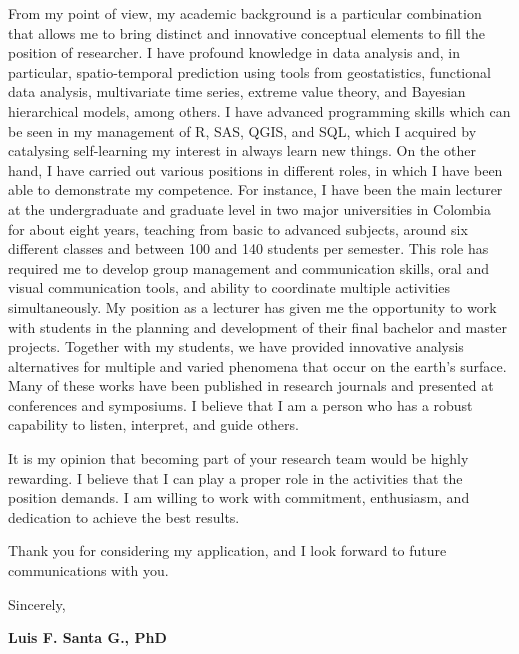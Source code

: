 \documentclass[11pt, a4paper]{awesome-cv}
\begin{document}
\begin{cvletter}
From my point of view, my academic background is a particular combination that allows me to bring distinct and innovative conceptual elements to fill the position of researcher. I have profound knowledge in data analysis and, in particular, spatio-temporal prediction using tools from geostatistics, functional data analysis, multivariate time series, extreme value theory, and  Bayesian hierarchical models, among others. I have advanced programming skills which can be seen in my management of R, SAS, QGIS, and SQL, which I acquired by catalysing self-learning my interest in always learn new things. On the other hand, I have carried out various positions in different roles, in which I have been able to demonstrate my competence. For instance, I have been the main lecturer at the undergraduate and graduate level in two major universities in Colombia for about eight years, teaching from basic to advanced subjects, around six different classes and between 100 and 140 students per semester. This role has required me to develop group management and communication skills, oral and visual communication tools, and ability to coordinate multiple activities simultaneously. My position as a lecturer has given me the opportunity to work with students in the planning and development of their final bachelor and master projects. Together with my students, we have provided innovative analysis alternatives for multiple and varied phenomena that occur on the earth's surface. Many of these works have been published in research journals and presented at conferences and symposiums. I believe that I am a person who has a robust capability to listen, interpret, and guide others. \par
It is my opinion that becoming part of your research team would be highly rewarding. I believe that I can play a proper role in the activities that the position demands. I am willing to work with commitment, enthusiasm, and dedication to achieve the best results.\par
Thank you for considering my application, and I look forward to future communications with you.\par
Sincerely,\par
{\bf Luis F. Santa G., PhD}
\end{cvletter}


\end{document}
